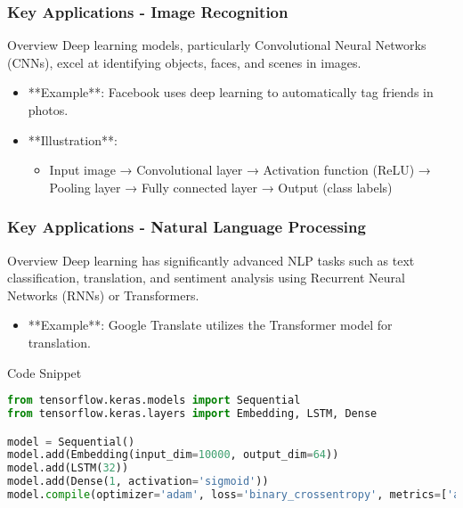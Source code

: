\documentclass[aspectratio=169]{beamer}
\begin{document}
\begin{frame}[fragile]
    \frametitle{Key Applications - Image Recognition}
    \begin{block}{Overview}
        Deep learning models, particularly Convolutional Neural Networks (CNNs), excel at identifying objects, faces, and scenes in images.
    \end{block}
    \begin{itemize}
        \item **Example**: Facebook uses deep learning to automatically tag friends in photos.
        \item **Illustration**:
        \begin{itemize}
            \item Input image → Convolutional layer → Activation function (ReLU) → Pooling layer → Fully connected layer → Output (class labels)
        \end{itemize}
    \end{itemize}
\end{frame}

\begin{frame}[fragile]
    \frametitle{Key Applications - Natural Language Processing}
    \begin{block}{Overview}
        Deep learning has significantly advanced NLP tasks such as text classification, translation, and sentiment analysis using Recurrent Neural Networks (RNNs) or Transformers.
    \end{block}
    \begin{itemize}
        \item **Example**: Google Translate utilizes the Transformer model for translation.
    \end{itemize}
    \begin{block}{Code Snippet}
        \begin{lstlisting}[language=Python]
from tensorflow.keras.models import Sequential
from tensorflow.keras.layers import Embedding, LSTM, Dense

model = Sequential()
model.add(Embedding(input_dim=10000, output_dim=64))
model.add(LSTM(32))
model.add(Dense(1, activation='sigmoid'))
model.compile(optimizer='adam', loss='binary_crossentropy', metrics=['accuracy'])
        \end{lstlisting}
    \end{block}
\end{frame}
\end{document}
